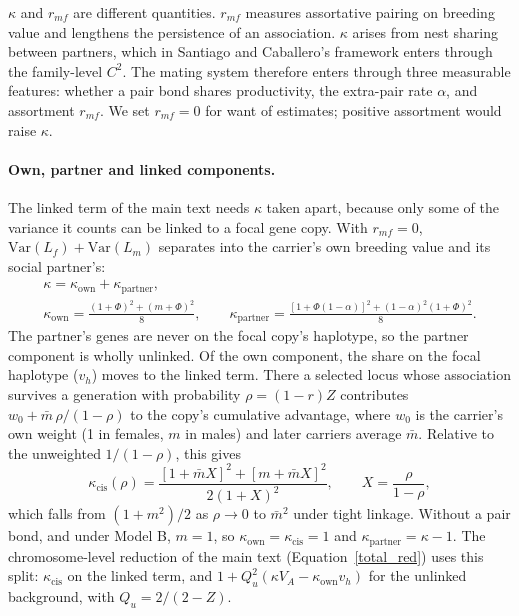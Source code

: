 \documentclass[12pt]{article}
\begin{document}
$\kappa$ and $r_{mf}$ are different quantities. $r_{mf}$ measures assortative pairing on breeding value and lengthens the persistence of an association. $\kappa$ arises from nest sharing between partners, which in Santiago and Caballero's framework enters through the family-level $C^2$. The mating system therefore enters through three measurable features: whether a pair bond shares productivity, the extra-pair rate $\alpha$, and assortment $r_{mf}$. We set $r_{mf} = 0$ for want of estimates; positive assortment would raise $\kappa$.

\paragraph{Own, partner and linked components.} The linked term of the main text needs $\kappa$ taken apart, because only some of the variance it counts can be linked to a focal gene copy. With $r_{mf} = 0$, $\mathrm{Var}(L_f) + \mathrm{Var}(L_m)$ separates into the carrier's own breeding value and its social partner's:
\begin{equation}
\begin{gathered}
    \kappa = \kappa_\text{own} + \kappa_\text{partner}, \\
    \kappa_\text{own} = \frac{(1+\Phi)^2 + (m+\Phi)^2}{8}, \qquad
    \kappa_\text{partner} = \frac{\left[1+\Phi(1-\alpha)\right]^2 + (1-\alpha)^2(1+\Phi)^2}{8}.
\end{gathered}
\label{eq:kappa_split}
\end{equation}
The partner's genes are never on the focal copy's haplotype, so the partner component is wholly unlinked. Of the own component, the share on the focal haplotype ($v_h$) moves to the linked term. There a selected locus whose association survives a generation with probability $\rho = (1-r)Z$ contributes $w_0 + \bar{m}\,\rho/(1-\rho)$ to the copy's cumulative advantage, where $w_0$ is the carrier's own weight (1 in females, $m$ in males) and later carriers average $\bar{m}$. Relative to the unweighted $1/(1-\rho)$, this gives
\begin{equation}
    \kappa_\text{cis}(\rho) = \frac{\left[1 + \bar{m}X\right]^2 + \left[m + \bar{m}X\right]^2}{2(1+X)^2}, \qquad X = \frac{\rho}{1-\rho},
\end{equation}
which falls from $(1+m^2)/2$ as $\rho \to 0$ to $\bar{m}^2$ under tight linkage. Without a pair bond, and under Model B, $m = 1$, so $\kappa_\text{own} = \kappa_\text{cis} = 1$ and $\kappa_\text{partner} = \kappa - 1$. The chromosome-level reduction of the main text (Equation~\eqref{total_red}) uses this split: $\kappa_\text{cis}$ on the linked term, and $1 + Q_u^2(\kappa V_A - \kappa_\text{own}v_h)$ for the unlinked background, with $Q_u = 2/(2-Z)$.
\end{document}
